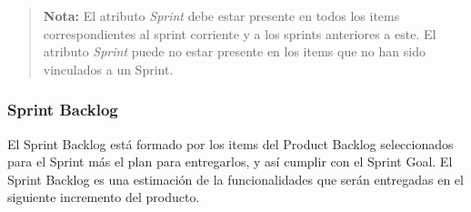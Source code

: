     \begin{quote}
    {\bf Nota:} El atributo {\it Sprint} debe estar presente en todos los items correspondientes
                al sprint corriente y a los sprints anteriores a este. El atributo {\it Sprint}
                puede no estar presente en los items que no han sido vinculados a un Sprint. 
    \end{quote}
    
\subsubsection{Sprint Backlog}
    
 El Sprint Backlog está formado por los items del Product Backlog seleccionados para el Sprint más
 el plan para entregarlos, y así cumplir con el Sprint Goal. El Sprint Backlog es una estimación de
 la funcionalidades que serán entregadas en el siguiente incremento del producto.\\

    

